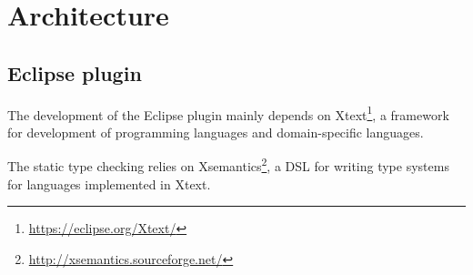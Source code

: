 \section{Architecture}



\subsection{Eclipse plugin}
The development of the Eclipse plugin mainly depends on Xtext\footnote{\url{https://eclipse.org/Xtext/}}, a framework for 
development of programming languages and domain-specific languages.

The static type checking relies on Xsemantics\footnote{\url{http://xsemantics.sourceforge.net/}}, a DSL for writing type systems for languages implemented in Xtext.